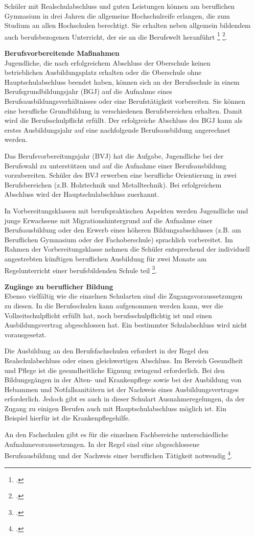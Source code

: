 Schüler mit Realschulabschluss und guten Leistungen können am beruflichen Gymnasium in drei Jahren die allgemeine Hochschulreife erlangen, die zum Studium an allen Hochschulen berechtigt. Sie erhalten neben allgemein bildendem auch berufsbezogenen Unterricht, der sie an die Berufswelt heranführt \footcite[vgl.]{SBSBSSSK2015} \footcite[vgl.][4ff]{SMKSK2013}.


\textbf{Berufsvorbereitende Maßnahmen}\\
Jugendliche, die nach erfolgreichem Abschluss der Oberschule keinen betrieblichen Ausbildungsplatz erhalten oder die Oberschule ohne Hauptschulabschluss beendet haben, können sich an der Berufsschule in einem Berufsgrundbildungsjahr (BGJ) auf die Aufnahme eines Berufsausbildungsverhältnisses oder eine Berufstätigkeit vorbereiten. Sie können eine berufliche Grundbildung in verschiedenen Berufsbereichen erhalten. Damit wird die Berufsschulpflicht erfüllt. Der erfolgreiche Abschluss des BGJ kann als erstes Ausbildungsjahr auf eine nachfolgende Berufsausbildung angerechnet werden.

Das Berufsvorbereitungsjahr (BVJ) hat die Aufgabe, Jugendliche bei der Berufswahl zu unterstützen und auf die Aufnahme einer Berufsausbildung vorzubereiten. Schüler des BVJ erwerben eine berufliche Orientierung in zwei Berufsbereichen (z.B. Holztechnik und Metalltechnik). Bei erfolgreichem Abschluss wird der Hauptschulabschluss zuerkannt.

In Vorbereitungsklassen mit berufspraktischen Aspekten werden Jugendliche und junge Erwachsene mit Migrationshintergrund auf die Aufnahme einer Berufsausbildung oder den Erwerb eines höheren Bildungsabschlusses (z.B. am Beruflichen Gymnasium oder der Fachoberschule) sprachlich vorbereitet. Im Rahmen der Vorbereitungsklasse nehmen die Schüler entsprechend der individuell angestrebten künftigen beruflichen Ausbildung für zwei Monate am Regelunterricht einer berufsbildenden Schule teil \footcite[vgl.][15ff]{SMKSK2013}.


\textbf{Zugänge zu beruflicher Bildung}\\
Ebenso vielfältig wie die einzelnen Schularten sind die Zugangsvoraussetzungen zu diesen. In die Berufsschulen kann aufgenommen werden kann, wer die Vollzeitschulpflicht erfüllt hat, noch berufsschulpflichtig ist und einen Ausbildungsvertrag abgeschlossen hat. Ein bestimmter Schulabschluss wird nicht vorausgesetzt.

Die Ausbildung an den Berufsfachschulen erfordert in der Regel den Realschulabschluss oder einen gleichwertigen Abschluss. Im Bereich Gesundheit und Pflege ist die gesundheitliche Eignung zwingend erforderlich. Bei den Bildungsgängen in der Alten- und Krankenpflege sowie bei der Ausbildung von Hebammen und Notfallsanitätern ist der Nachweis eines Ausbildungsvertrages erforderlich. Jedoch gibt es auch in dieser Schulart Ausnahmeregelungen, da der Zugang zu einigen Berufen auch mit Hauptschulabschluss möglich ist. Ein Beispiel hierfür ist die Krankenpflegehilfe.
 
An den Fachschulen gibt es für die einzelnen Fachbereiche unterschiedliche Aufnahmevoraussetzungen. In der Regel sind eine abgeschlossene Berufsausbildung und der Nachweis einer beruflichen Tätigkeit notwendig \footcite[vgl.][15ff]{SMKSK2013}.



